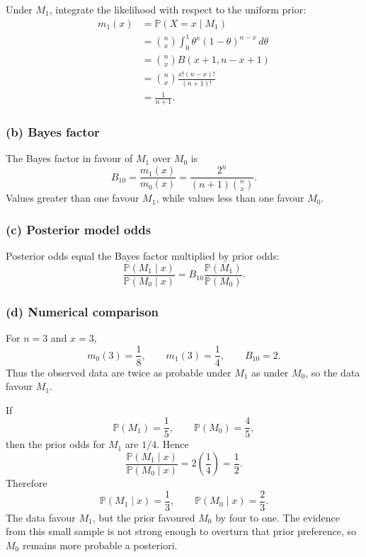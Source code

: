 \documentclass[11pt,a4paper]{article}
\begin{document}
Under \(M_1\), integrate the likelihood with respect to the uniform prior:
\begin{align*}
m_1(x)
&=
\mathbb{P}(X=x\mid M_1)\\
&=
\binom{n}{x}
\int_0^1\theta^x(1-\theta)^{n-x}\,d\theta\\
&=
\binom{n}{x}B(x+1,n-x+1)\\
&=
\binom{n}{x}
\frac{x!(n-x)!}{(n+1)!}\\
&=
\boxed{\frac{1}{n+1}}.
\end{align*}

\subsubsection*{(b) Bayes factor}

The Bayes factor in favour of \(M_1\) over \(M_0\) is
\[
\boxed{
B_{10}
=
\frac{m_1(x)}{m_0(x)}
=
\frac{2^n}{(n+1)\binom{n}{x}}.
}
\]
Values greater than one favour \(M_1\), while values less than one favour
\(M_0\).

\subsubsection*{(c) Posterior model odds}

Posterior odds equal the Bayes factor multiplied by prior odds:
\[
\boxed{
\frac{\mathbb{P}(M_1\mid x)}{\mathbb{P}(M_0\mid x)}
=
B_{10}
\frac{\mathbb{P}(M_1)}{\mathbb{P}(M_0)}.
}
\]

\subsubsection*{(d) Numerical comparison}

For \(n=3\) and \(x=3\),
\[
m_0(3)=\frac18,
\qquad
m_1(3)=\frac14,
\qquad
B_{10}=2.
\]
Thus the observed data are twice as probable under \(M_1\) as under \(M_0\),
so the data favour \(M_1\).

If
\[
\mathbb{P}(M_1)=\frac15,
\qquad
\mathbb{P}(M_0)=\frac45,
\]
then the prior odds for \(M_1\) are \(1/4\). Hence
\[
\frac{\mathbb{P}(M_1\mid x)}{\mathbb{P}(M_0\mid x)}
=2\left(\frac14\right)
=\frac12.
\]
Therefore
\[
\boxed{
\mathbb{P}(M_1\mid x)=\frac13,
\qquad
\mathbb{P}(M_0\mid x)=\frac23.
}
\]
The data favour \(M_1\), but the prior favoured \(M_0\) by four to one. The
evidence from this small sample is not strong enough to overturn that prior
preference, so \(M_0\) remains more probable a posteriori.

\clearpage
\end{document}
